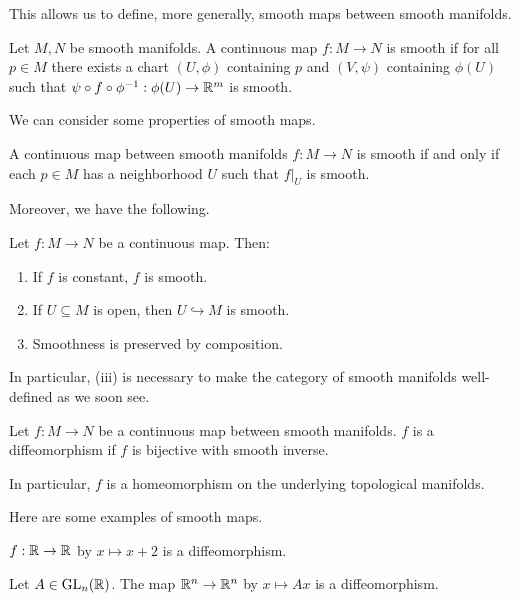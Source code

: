 This allows us to define, more generally, smooth maps between smooth manifolds. 
\begin{definition}
    Let $M,N$ be smooth manifolds. A continuous map $f:M\to N$ is smooth if for all $p\in M$ there exists a chart $(U,\phi)$ containing $p$ and $(V,\psi)$ containing $\phi(U)$ such that $\psi\circ f\circ\phi^{-1}:\phi(U)\to\mathbb{R}^{m}$ is smooth. 
\end{definition}
We can consider some properties of smooth maps. 
\begin{proposition}\label{prop: smoothness is local}
    A continuous map between smooth manifolds $f:M\to N$ is smooth if and only if each $p\in M$ has a neighborhood $U$ such that $f|_{U}$ is smooth. 
\end{proposition}
Moreover, we have the following. 
\begin{proposition}\label{prop: stability properties of smooth maps}
    Let $f:M\to N$ be a continuous map. Then:
    \begin{enumerate}[label=(\roman*)]
        \item If $f$ is constant, $f$ is smooth. 
        \item If $U\subseteq M$ is open, then $U\hookrightarrow M$ is smooth. 
        \item Smoothness is preserved by composition. 
    \end{enumerate}
\end{proposition}
In particular,  (iii) is necessary to make the category of smooth manifolds well-defined as we soon see.  
\begin{definition}[Diffeomorphism]\label{def: diffeomorphism}
    Let $f:M\to N$ be a continuous map between smooth manifolds. $f$ is a diffeomorphism if $f$ is bijective with smooth inverse. 
\end{definition}
\begin{remark}
    In particular, $f$ is a homeomorphism on the underlying topological manifolds. 
\end{remark}
Here are some examples of smooth maps. 
\begin{example}\label{ex: linear maps are diffeomorphisms}
    $f:\mathbb{R}\to\mathbb{R}$ by $x\mapsto x+2$ is a diffeomorphism. 
\end{example}
\begin{example}\label{ex: linear transformation is a diffeomorphism}
    Let $A\in\mathrm{GL}_{n}(\mathbb{R})$. The map $\mathbb{R}^{n}\to\mathbb{R}^{n}$ by $x\mapsto Ax$ is a diffeomorphism. 
\end{example}
